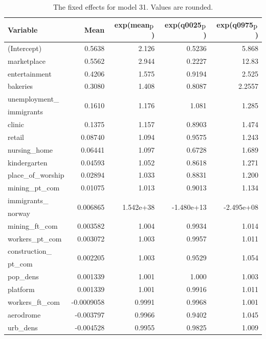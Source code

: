 \begin{table}[H] 
\caption{The fixed effects for model 31. Values are rounded. \label{fixedAllNorway}}
\begin{tabular}{l r r r r}
\toprule
\textbf{Variable}	& \textbf{Mean}	& \textbf{exp(mean$_{\hbox{p}}$)} & \textbf{exp(q0025$_{\hbox{p}}$)} & \textbf{exp(q0975$_{\hbox{p}}$)} \\
\midrule
(Intercept) & 0.5638 & 2.126 & 0.5236 & 5.868 \\
marketplace & 0.5562 & 2.944 & 0.2227 & 12.83 \\
entertainment & 0.4206 & 1.575 & 0.9194 & 2.525 \\
bakeries & 0.3080 & 1.408 & 0.8087 & 2.2557 \\
unemployment\_ & \multirow{2}{*}{0.1610} & \multirow{2}{*}{1.176} & \multirow{2}{*}{1.081} & \multirow{2}{*}{1.285} \\
immigrants \\
clinic & 0.1375 & 1.157 & 0.8903 & 1.474 \\
retail & 0.08740 & 1.094 & 0.9575 & 1.243 \\
nursing\_home & 0.06441 & 1.097 & 0.6728 & 1.689 \\
kindergarten & 0.04593 & 1.052 & 0.8618 & 1.271 \\
place\_of\_worship & 0.02894 & 1.033 & 0.8831 & 1.200 \\
mining\_pt\_com & 0.01075 & 1.013 & 0.9013 & 1.134 \\
immigrants\_ & \multirow{2}{*}{0.006865} & \multirow{2}{*}{1.542e+38} & \multirow{2}{*}{-1.480e+13} & \multirow{2}{*}{-2.495e+08} \\
norway \\
mining\_ft\_com & 0.003582 & 1.004 & 0.9934 & 1.014 \\
workers\_pt\_com & 0.003072 & 1.003 & 0.9957 & 1.011 \\
construction\_ & \multirow{2}{*}{0.002205} & \multirow{2}{*}{1.003} & \multirow{2}{*}{0.9529} & \multirow{2}{*}{1.054} \\
pt\_com \\
pop\_dens & 0.001339 & 1.001 & 1.000 & 1.003 \\
platform & 0.001339 & 1.001 & 0.9916 & 1.011 \\
workers\_ft\_com & -0.0009058 & 0.9991 & 0.9968 & 1.001 \\
aerodrome & -0.003797 & 0.9966 & 0.9402 & 1.045 \\
urb\_dens & -0.004528 & 0.9955 & 0.9825 & 1.009 \\

\end{tabular}
\end{table}
